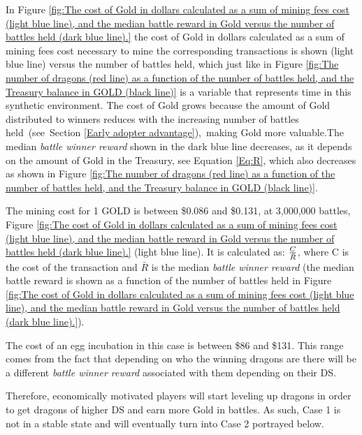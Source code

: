 \documentclass[12pt]{article}
\begin{document}
{%


In Figure \ref{fig:The cost of Gold in dollars calculated as a sum of mining fees cost (light blue line), and the median battle reward in Gold versus the number of battles held (dark blue line).} the cost of Gold in dollars calculated as a sum of mining fees cost necessary to mine the corresponding transactions is shown (light blue line) versus the number of battles held, which just like in Figure \ref{fig:The number of dragons (red line) as a function of the number of battles held, and the Treasury balance in GOLD (black line)} is a variable that represents time in this synthetic environment. The cost of Gold grows because the amount of Gold distributed to winners reduces with the increasing number of battles held\ (see\ Section   \ref{Early adopter advantage}),\ making Gold more valuable.The median {\it battle winner reward} shown in the dark blue line decreases, as it depends on the amount of Gold in the Treasury, see Equation  \ref{Eq:R}, which also decreases as shown in Figure \ref{fig:The number of dragons (red line) as a function of the number of battles held, and the Treasury balance in GOLD (black line)}.\par

The mining cost for 1 GOLD is between \$0.086 and \$0.131, at 3,000,000 battles, Figure \ref{fig:The cost of Gold in dollars calculated as a sum of mining fees cost (light blue line), and the median battle reward in Gold versus the number of battles held (dark blue line).} (light blue line).  It is calculated as:  ${{C}\over{\bar R}}$, where C is the cost of the transaction and  $\bar R$ is the median \textit{battle winner reward} (the median battle reward is shown as a function of the number of battles held in Figure \ref{fig:The cost of Gold in dollars calculated as a sum of mining fees cost (light blue line), and the median battle reward in Gold versus the number of battles held (dark blue line).}).\par

The cost of an egg incubation in this case is between \$86 and \$131. This range comes from the fact that depending on who the winning dragons are there will be a different \textit{battle winner reward} associated with them depending on their DS.\par

Therefore, economically motivated players will start leveling up dragons in order to get dragons of higher DS and earn more Gold in battles. As such, Case 1 is not in a stable state and will eventually turn into Case 2 portrayed below.\par


}
\end{document}
